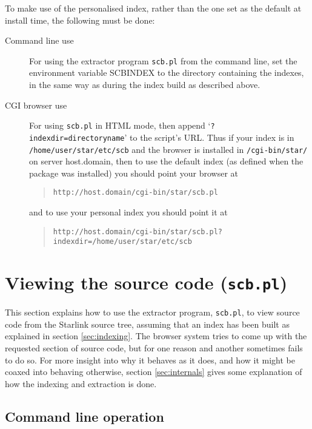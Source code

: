 \documentclass[twoside,11pt]{article}
\newcommand{\xlabel}[1]{}
\renewcommand{\_}{\texttt{\symbol{95}}}
\begin{document}
To make use of the personalised index, rather than the one set as
the default at install time, the following must be done:
\begin{description}
\item[Command line use]
For using the extractor program {\tt scb.pl} from the command line, 
set the environment variable SCB\_INDEX to the directory containing
the indexes, in the same way as during the index build as described
above.
\item[CGI browser use]
For using {\tt scb.pl} in HTML mode, then append 
`{\tt ?indexdir=directoryname}' to the script's URL.
Thus if your index is in {\tt /home/user/star/etc/scb}
and the browser is installed in {\tt /cgi-bin/star/} on server
host.domain, then to use the default index (as defined when the
package was installed) you should point
your browser at
\begin{quote}
\begin{verbatim}
http://host.domain/cgi-bin/star/scb.pl
\end{verbatim}
\end{quote}
and to use your personal index you should point it at
\begin{quote}
\begin{verbatim}
http://host.domain/cgi-bin/star/scb.pl?indexdir=/home/user/star/etc/scb
\end{verbatim}
\end{quote}
\end{description}


\section{\xlabel{sec:extract}\label{sec:extract}Viewing the source code
         ({\tt scb.pl})}

This section explains how to use the extractor program, {\tt scb.pl},
to view source code from the Starlink source tree,
assuming that an index has been built as explained in 
section \ref{sec:indexing}.
The browser system tries to come up with the requested section of
source code, but for one reason and another sometimes fails to 
do so.  
For more insight into why it behaves as it does, and 
how it might be coaxed into behaving otherwise, 
section \ref{sec:internals} gives some explanation of how the
indexing and extraction is done.


\subsection{\xlabel{sec:extract-commandline}\label{sec:extract-commandline}Command line operation}
\end{document}
